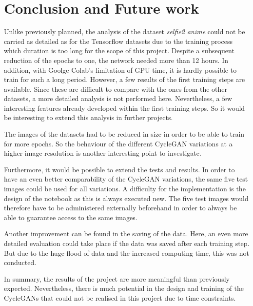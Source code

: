 \documentclass[fleqn,10pt]{SelfArx} %
\begin{document}
\section{Conclusion and Future work}
Unlike previously planned, the analysis of the dataset \textit{selfie2 anime} could not be carried as detailed as for the Tensorflow datasets due to the training process which duration is too long for the scope of this project. Despite a subsequent reduction of the epochs to one, the network needed more than 12 hours. In addition, with Goolge Colab's limitation of GPU time, it is hardly possible to train for such a long period. However, a few results of the first training steps are available. Since these are difficult to compare with the ones from the other datasets, a more detailed analysis is not performed here. Nevertheless, a few interesting features already developed within the first training steps. So it would be interesting to extend this analysis in further projects.

The images of the datasets had to be reduced in size in order to be able to train for more epochs. So the behaviour of the different Cycle\ac{GAN} variations at a higher image resolution is another interesting point to investigate.

Furthermore, it would be possible to extend the tests and results. In order to have an even better comparability of the Cycle\ac{GAN} variations, the same five test images could be used for all variations. A difficulty for the implementation is the design of the notebook as this is always executed new. The five test images would therefore have to be administered externally beforehand in order to always be able to guarantee access to the same images.

Another improvement can be found in the saving of the data. Here, an even more detailed evaluation could take place if the data was saved after each training step. But due to the huge flood of data and the increased computing time, this was not conducted.

In summary, the results of the project are more meaningful than previously expected. Nevertheless, there is much potential in the design and training of the Cycle\ac{GAN}s that could not be realised in this project due to time constraints.


\end{document}
